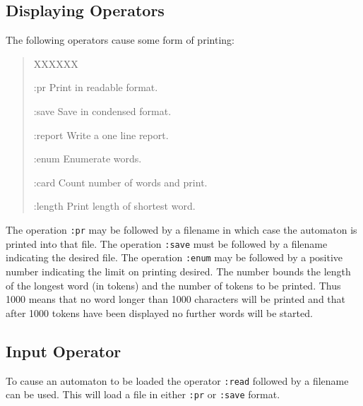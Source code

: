 \subsection{Displaying Operators}
The following operators cause some form of printing:
\begin{quote}
\begin{describe}{XXXXXX}
\item[:pr] Print in readable format.
\item[:save] Save in condensed format.
\item[:report] Write a one line report.
\item[:enum] Enumerate words.
\item[:card] Count number of words and print.
\item[:length] Print length of shortest word.
\end{describe}
\end{quote}
The operation \verb#:pr# may be followed by a filename in which case the
automaton is printed into that file.
The operation \verb#:save# must be followed by a filename indicating the
desired file.
The operation \verb#:enum# may be followed by a positive number indicating
the limit on printing desired.
The number bounds the length of the longest word (in tokens) and the number
of tokens to be printed.
Thus 1000 means that no word longer than 1000 characters will be printed
and that after 1000 tokens have been displayed no further words will be
started.

\subsection{Input Operator}
To cause an automaton to be loaded the operator \verb#:read# followed by a
filename can be used.
This will load a file in either \verb#:pr# or \verb#:save# format.
